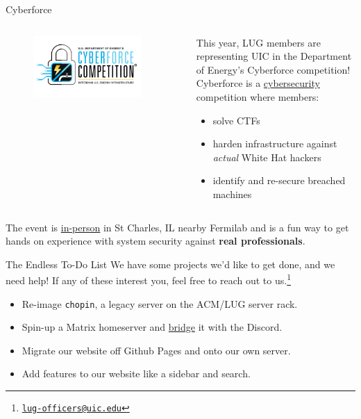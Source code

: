 \documentclass{beamer}
\begin{document}
\begin{frame}{Cyberforce}
	\begin{columns}
		\begin{column}{0.4\textwidth}
			\begin{figure}
				\centering
				\includegraphics[width=0.9\textwidth]{cyberforce.png}
			\end{figure}
		\end{column}
		\begin{column}{0.6\textwidth}
			This year, LUG members are representing UIC in the
			Department of Energy's Cyberforce competition!
			\pause
			Cyberforce is a \underline{cybersecurity} competition
			where members:
			\begin{itemize}
				\item solve CTFs
					\pause
				\item harden infrastructure against
					\textit{actual} White Hat hackers
					\pause
				\item identify and re-secure breached machines
					\pause
			\end{itemize}
		\end{column}
	\end{columns}

	\vspace{0.3cm}

	The event is \underline{in-person} in St Charles, IL nearby Fermilab
	and is a fun way to get hands on experience with system security
	against \textbf{real professionals}.
\end{frame}

\begin{frame}{The Endless To-Do List}
	We have some projects we'd like to get done, and we need help! If any
	of these interest you, feel free to reach out to us.\footnote{
		\href{mailto:lug-officers@uic.edu}{\texttt{lug-officers@uic.edu}}}
	\pause

	\begin{itemize}
		\item Re-image \texttt{chopin}, a legacy server on the ACM/LUG
			server rack.
		\item Spin-up a Matrix homeserver and \underline{bridge} it
			with the Discord.
		\item Migrate our website off Github Pages and onto our own
			server.
		\item Add features to our website like a sidebar and search.
	\end{itemize}
\end{frame}
\end{document}
